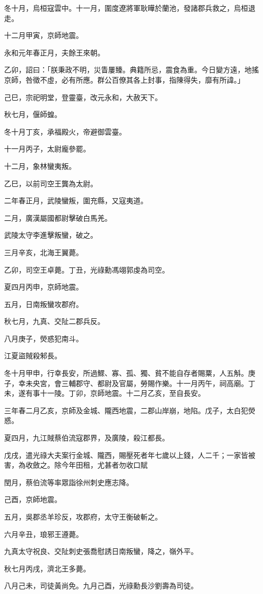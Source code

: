 \begin{pinyinscope}
冬十月，烏桓寇雲中。十一月，圍度遼將軍耿曄於蘭池，發諸郡兵救之，烏桓退走。

十二月甲寅，京師地震。

永和元年春正月，夫餘王來朝。

乙卯，詔曰：「朕秉政不明，災眚屢臻。典籍所忌，震食為重。今日變方遠，地搖京師，咎徵不虛，必有所應。群公百僚其各上封事，指陳得失，靡有所諱。」

己巳，宗祀明堂，登靈臺，改元永和，大赦天下。

秋七月，偃師蝗。

冬十月丁亥，承福殿火，帝避御雲臺。

十一月丙子，太尉龐參罷。

十二月，象林蠻夷叛。

乙巳，以前司空王龔為太尉。

二年春正月，武陵蠻叛，圍充縣，又寇夷道。

二月，廣漢屬國都尉擊破白馬羌。

武陵太守李進擊叛蠻，破之。

三月辛亥，北海王翼薨。

乙卯，司空王卓薨。丁丑，光祿勳馮翊郭虔為司空。

夏四月丙申，京師地震。

五月，日南叛蠻攻郡府。

秋七月，九真、交阯二郡兵反。

八月庚子，熒惑犯南斗。

江夏盜賊殺邾長。

冬十月甲申，行幸長安，所過鰥、寡、孤、獨、貧不能自存者賜粟，人五斛。庚子，幸未央宮，會三輔郡守、都尉及官屬，勞賜作樂。十一月丙午，祠高廟。丁未，遂有事十一陵。丁卯，京師地震。十二月乙亥，至自長安。

三年春二月乙亥，京師及金城、隴西地震，二郡山岸崩，地陷。戊子，太白犯熒惑。

夏四月，九江賊蔡伯流寇郡界，及廣陵，殺江都長。

戊戌，遣光祿大夫案行金城、隴西，賜壓死者年七歲以上錢，人二千；一家皆被害，為收斂之。除今年田租，尤甚者勿收口賦

閏月，蔡伯流等率眾詣徐州刺史應志降。

己酉，京師地震。

五月，吳郡丞羊珍反，攻郡府，太守王衡破斬之。

六月辛丑，琅邪王遵薨。

九真太守祝良、交阯刺史張喬慰誘日南叛蠻，降之，嶺外平。

秋七月丙戌，濟北王多薨。

八月己未，司徒黃尚免。九月己酉，光祿勳長沙劉壽為司徒。


\end{pinyinscope}
